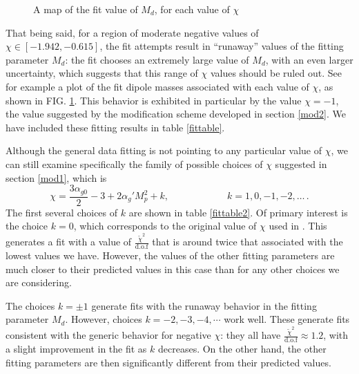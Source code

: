\documentclass[aps, prd, preprintnumbers, floatfix, showpacs, showkeys, nofootinbib, 10pt]{revtex4-1}
\def\beq{\begin{equation}}
\def\eeq{\end{equation}}
\begin{document}
\begin{figure}
\begin{center}
\caption{\label{chivsmd} A map of the fit value of $M_d$, for each value of $\chi$}
\end{center}
\end{figure}

That being said, for a region of moderate negative values of $\chi \in [-1.942, -0.615]$, the fit attempts result in ``runaway'' values of the fitting parameter $M_d$: the fit chooses an extremely large value of $M_d$, with an even larger uncertainty, which suggests that this range of $\chi$ values should be ruled out.  See for example a plot of the fit dipole masses associated with each value of $\chi$, as shown in FIG. \ref{chivsmd}.  This behavior is exhibited in particular by the value $\chi = -1$, the value suggested by the modification scheme developed in section \ref{mod2}.  We have included these fitting results in table \ref{fittable}.

Although the general data fitting is not pointing to any particular value of $\chi$, we can still examine specifically the family of possible choices of $\chi$ suggested in section \ref{mod1}, which is
\beq
\label{chik}
\chi = \frac{3\alpha_{g0}}{2} - 3 + 2\alpha_g' M_p^2 + k, \hspace{1in} k = 1, 0, -1, -2, \dots \, .
\eeq
The first several choices of $k$ are shown in table \ref{fittable2}.  Of primary interest is the choice $k = 0$, which corresponds to the original value of $\chi$ used in \cite{DHM}.  This generates a fit with a value of $\frac{\tilde{\chi}^2}{\mathrm{d.o.f}}$ that is around twice that associated with the lowest values we have.  However, the values of the other fitting parameters are much closer to their predicted values in this case than for any other choices we are considering.

The choices $k = \pm 1$ generate fits with the runaway behavior in the fitting parameter $M_d$.  However, choices $k = -2, -3, -4, \cdots$ work well.  These generate fits consistent with the generic behavior for negative $\chi$: they all have $\frac{\tilde{\chi}^2}{\mathrm{d.o.f}} \approx 1.2$, with a slight improvement in the fit as $k$ decreases.  On the other hand, the other fitting parameters are then significantly different from their predicted values.
\end{document}
